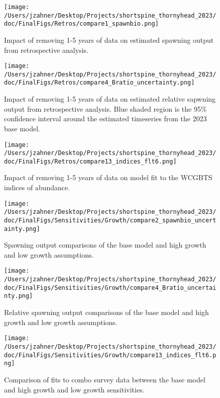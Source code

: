 \documentclass[11pt,
  english,
  letterpaper,
]{article}
\begin{document}
\clearpage

\begin{figure}
\centering
\texttt{[image: /Users/jzahner/Desktop/Projects/shortspine\_thornyhead\_2023/doc/FinalFigs/Retros/compare1\_spawnbio.png]}
\caption{Impact of removing 1-5 years of data on estimated spawning output from retrospective analysis.\label{fig:retros_spawnbio}}
\end{figure}

\begin{figure}
\centering
\texttt{[image: /Users/jzahner/Desktop/Projects/shortspine\_thornyhead\_2023/doc/FinalFigs/Retros/compare4\_Bratio\_uncertainty.png]}
\caption{Impact of removing 1-5 years of data on estimated relative sapwning output from retrospective analysis. Blue shaded region is the 95\% confidence interval around the estimated timeseries from the 2023 base model.\label{fig:retros_bratio_uncertainty}}
\end{figure}

\begin{figure}
\centering
\texttt{[image: /Users/jzahner/Desktop/Projects/shortspine\_thornyhead\_2023/doc/FinalFigs/Retros/compare13\_indices\_flt6.png]}
\caption{Impact of removing 1-5 years of data on model fit to the WCGBTS indices of abundance.\label{fig:retros_indices}}
\end{figure}

\begin{figure}
\centering
\texttt{[image: /Users/jzahner/Desktop/Projects/shortspine\_thornyhead\_2023/doc/FinalFigs/Sensitivities/Growth/compare2\_spawnbio\_uncertainty.png]}
\caption{Spawning output comparisons of the base model and high growth and low growth assumptions.\label{fig:growth_sensitiv_spawning}}
\end{figure}

\begin{figure}
\centering
\texttt{[image: /Users/jzahner/Desktop/Projects/shortspine\_thornyhead\_2023/doc/FinalFigs/Sensitivities/Growth/compare4\_Bratio\_uncertainty.png]}
\caption{Relative spawning output comparisons of the base model and high growth and low growth assumptions.\label{fig:growth_sensitiv_mngmt}}
\end{figure}

\begin{figure}
\centering
\texttt{[image: /Users/jzahner/Desktop/Projects/shortspine\_thornyhead\_2023/doc/FinalFigs/Sensitivities/Growth/compare13\_indices\_flt6.png]}
\caption{Comparison of fits to combo survey data between the base model and high growth and low growth sensitivities.\label{fig:growth_sensitiv_indx}}
\end{figure}
\end{document}
